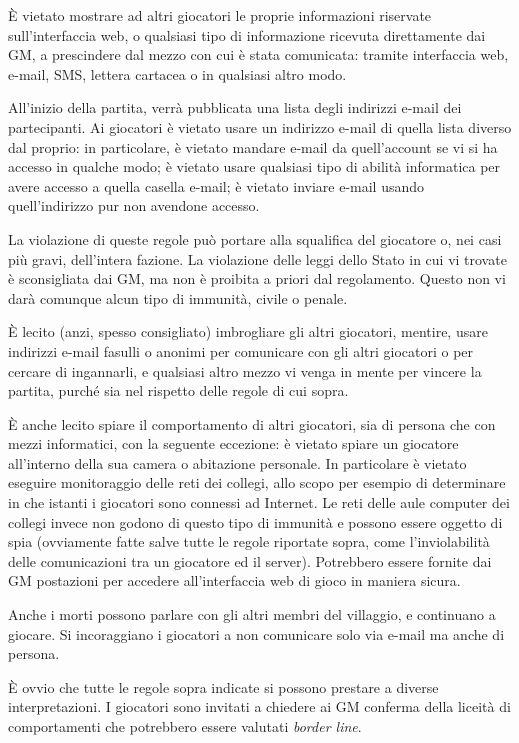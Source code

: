 \documentclass[a4paper,10pt]{article}
\begin{document}
È vietato mostrare ad altri giocatori le proprie informazioni riservate sull'interfaccia web, o qualsiasi tipo di informazione ricevuta direttamente dai GM, a prescindere dal mezzo con cui è stata comunicata: tramite interfaccia web, e-mail, SMS, lettera cartacea o in qualsiasi altro modo.

All'inizio della partita, verrà pubblicata una lista degli indirizzi e-mail dei partecipanti. Ai giocatori è vietato usare un indirizzo e-mail di quella lista diverso dal proprio: in particolare, è vietato mandare e-mail da quell'account se vi si ha accesso in qualche modo; è vietato usare qualsiasi tipo di abilità informatica per avere accesso a quella casella e-mail; è vietato inviare e-mail usando quell'indirizzo pur non avendone accesso.

La violazione di queste regole può portare alla squalifica del giocatore o, nei casi più gravi, dell'intera fazione. La violazione delle leggi dello Stato in cui vi trovate è sconsigliata dai GM, ma non è proibita a priori dal regolamento. Questo non vi darà comunque alcun tipo di immunità, civile o penale.

È lecito (anzi, spesso consigliato) imbrogliare gli altri giocatori, mentire, usare indirizzi e-mail fasulli o anonimi per comunicare con gli altri giocatori o per cercare di ingannarli, e qualsiasi altro mezzo vi venga in mente per vincere la partita, purché sia nel rispetto delle regole di cui sopra.

È anche lecito spiare il comportamento di altri giocatori, sia di persona che con mezzi informatici, con la seguente eccezione: è vietato spiare un giocatore all'interno della sua camera o abitazione personale. In particolare è vietato eseguire monitoraggio delle reti dei collegi, allo scopo per esempio di determinare in che istanti i giocatori sono connessi ad Internet. Le reti delle aule computer dei collegi invece non godono di questo tipo di immunità e possono essere oggetto di spia (ovviamente fatte salve tutte le regole riportate sopra, come l'inviolabilità delle comunicazioni tra un giocatore ed il server). Potrebbero essere fornite dai GM postazioni per accedere all'interfaccia web di gioco in maniera sicura.

Anche i morti possono parlare con gli altri membri del villaggio, e continuano a giocare. Si incoraggiano i giocatori a non comunicare solo via e-mail ma anche di persona.

È ovvio che tutte le regole sopra indicate si possono prestare a diverse interpretazioni. I giocatori sono invitati a chiedere ai GM conferma della liceità di comportamenti che potrebbero essere valutati \emph{border line}.
\end{document}
